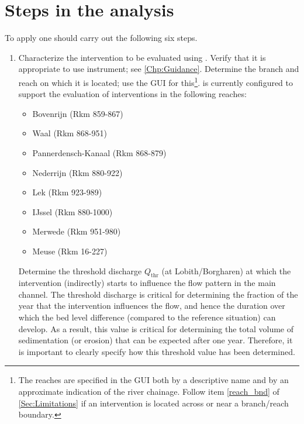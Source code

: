 \chapter{Steps in the analysis}\label{Chp:steps}

To apply \dfastmi one should carry out the following six steps.

\begin{enumerate}
\item Characterize the intervention to be evaluated using \dfmi.
Verify that it is appropriate to use \dfmi instrument; see \autoref{Chp:Guidance}.
Determine the branch and reach on which it is located; use the \dfmi GUI for this\footnote{The reaches are specified in the GUI both by a descriptive name and by an approximate indication of the river chainage.
Follow item \ref{reach_bnd} of \autoref{Sec:Limitations} if an intervention is located across or near a branch/reach boundary.}.
\dfmi is currently configured to support the evaluation of interventions in the following reaches:
\begin{itemize}
\item Bovenrijn (Rkm 859-867)
\item Waal (Rkm 868-951)
\item Pannerdensch-Kanaal (Rkm 868-879)
\item Nederrijn (Rkm 880-922)
\item Lek (Rkm 923-989)
\item IJssel (Rkm 880-1000)
\item Merwede (Rkm 951-980)
\item Meuse (Rkm 16-227)
\end{itemize}
Determine the threshold discharge $Q_\text{thr}$ (at Lobith/Borgharen) at which the intervention (indirectly) starts to influence the flow pattern in the main channel.
The threshold discharge is critical for determining the fraction of the year that the intervention influences the flow, and hence the duration over which the bed level difference (compared to the reference situation) can develop.
As a result, this value is critical for determining the total volume of sedimentation (or erosion) that can be expected after one year.
Therefore, it is important to clearly specify how this threshold value has been determined.


\end{enumerate}
